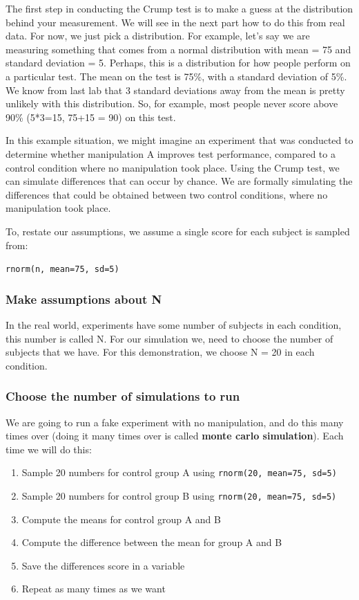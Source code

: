 \documentclass[
]{book}
\providecommand{\tightlist}{%
  \setlength{\itemsep}{0pt}\setlength{\parskip}{0pt}}
\begin{document}
The first step in conducting the Crump test is to make a guess at the distribution behind your measurement. We will see in the next part how to do this from real data. For now, we just pick a distribution. For example, let's say we are measuring something that comes from a normal distribution with mean = 75 and standard deviation = 5. Perhaps, this is a distribution for how people perform on a particular test. The mean on the test is 75\%, with a standard deviation of 5\%. We know from last lab that 3 standard deviations away from the mean is pretty unlikely with this distribution. So, for example, most people never score above 90\% (5*3=15, 75+15 = 90) on this test.

In this example situation, we might imagine an experiment that was conducted to determine whether manipulation A improves test performance, compared to a control condition where no manipulation took place. Using the Crump test, we can simulate differences that can occur by chance. We are formally simulating the differences that could be obtained between two control conditions, where no manipulation took place.

To, restate our assumptions, we assume a single score for each subject is sampled from:

\texttt{rnorm(n,\ mean=75,\ sd=5)}

\hypertarget{make-assumptions-about-n}{%
\subsubsection{Make assumptions about N}\label{make-assumptions-about-n}}

In the real world, experiments have some number of subjects in each condition, this number is called N. For our simulation we, need to choose the number of subjects that we have. For this demonstration, we choose N = 20 in each condition.

\hypertarget{choose-the-number-of-simulations-to-run}{%
\subsubsection{Choose the number of simulations to run}\label{choose-the-number-of-simulations-to-run}}

We are going to run a fake experiment with no manipulation, and do this many times over (doing it many times over is called \textbf{monte carlo simulation}). Each time we will do this:

\begin{enumerate}
\def\labelenumi{\arabic{enumi}.}
\tightlist
\item
  Sample 20 numbers for control group A using \texttt{rnorm(20,\ mean=75,\ sd=5)}
\item
  Sample 20 numbers for control group B using \texttt{rnorm(20,\ mean=75,\ sd=5)}
\item
  Compute the means for control group A and B
\item
  Compute the difference between the mean for group A and B
\item
  Save the differences score in a variable
\item
  Repeat as many times as we want
\end{enumerate}
\end{document}
